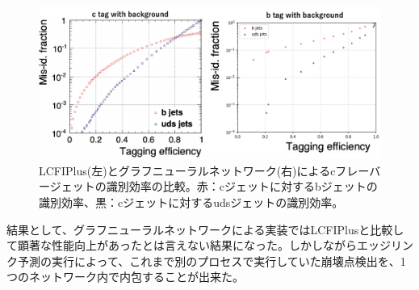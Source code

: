 \begin{figure}[H]
	\begin{center}
 \includegraphics[keepaspectratio, scale=0.3]
 	{Figure/Flavortagging/gnneff_c.png}
 		\caption{LCFIPlus(左)とグラフニューラルネットワーク(右)によるcフレーバージェットの識別効率の比較。赤：cジェットに対するbジェットの識別効率、黒：cジェットに対するudsジェットの識別効率。}
 		\label{gnneff_c}
	\end{center}
\end{figure}

結果として、グラフニューラルネットワークによる実装ではLCFIPlusと比較して顕著な性能向上があったとは言えない結果になった。しかしながらエッジリンク予測の実行によって、これまで別のプロセスで実行していた崩壊点検出を、1つのネットワーク内で内包することが出来た。